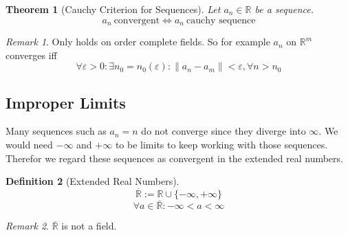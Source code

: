 \documentclass[english,titlepage]{uzhpub}
\theoremstyle{definition}
\newtheorem{definition}{Definition}[section]
\theoremstyle{plain}
\newtheorem{theorem}[definition]{Theorem} %
\theoremstyle{remark}
\newtheorem*{remark}{Remark}
\theoremstyle{example}
\begin{document}
   \begin{theorem}[Cauchy Criterion for Sequences]\label{thm:cauchy_crit_seq}
      Let \(a_n \in \mathbb{R}\) be a sequence.
      \[a_n~\text{convergent} \iff a_n~\text{cauchy sequence}\]
   \end{theorem}
   \begin{remark}
      Only holds on order complete fields.
      So for example \(a_n\) on \(\mathbb{R}^m\) converges iff
      \[\forall \varepsilon > 0: \exists n_0 = n_0(\varepsilon): \|a_n - a_m\| < \varepsilon, \forall n > n_0\]
   \end{remark}

   \subsection{Improper Limits}
   Many sequences such as \(a_n = n\) do not converge since they diverge into \(\infty\).
   We would need \(-\infty\) and \(+\infty\) to be limits to keep working with those sequences.
   Therefor we regard these sequences as convergent in the extended real numbers.

   \begin{definition}[Extended Real Numbers]
      \[\overline{\mathbb{R}} := \mathbb{R} \cup \{-\infty, +\infty\}\]
      \[\forall a \in \overline{\mathbb{R}}: -\infty < a < \infty\]
   \end{definition}
   \begin{remark}
      \(\overline{\mathbb{R}}\) is not a field.
   \end{remark}
\end{document}
